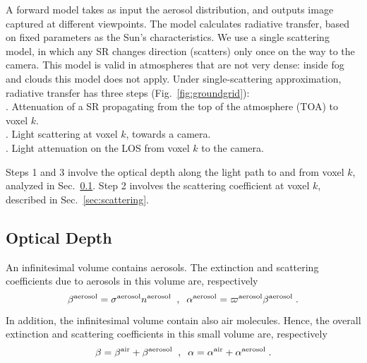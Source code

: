 \documentclass[10pt,twocolumn,letterpaper]{article}
\newcommand{\yoavcomment}[1]{}
\renewcommand{\yoavcomment}[1]{#1} %
\begin{document}
A forward model takes as input the aerosol distribution, and outputs image captured at different viewpoints. The model calculates radiative transfer, based on fixed parameters as the Sun's characteristics. We use a single scattering model, in which any SR changes direction (scatters) only once on the way to the camera. This model is valid in atmospheres that are not very dense: inside fog and clouds this model does not apply. Under single-scattering approximation, radiative transfer has three steps (Fig.~\ref{fig:groundgrid}):\\

\vspace{-0.35cm}
. Attenuation of a SR propagating from the top of the atmosphere
  (TOA) to voxel $k$. \\

\vspace{-0.35cm}
. Light scattering at voxel $k$, towards a camera.\\

\vspace{-0.35cm}
. Light attenuation on the LOS from voxel $k$ to the camera.

\noindent
Steps 1 and 3 involve the optical depth
along the light path to and from voxel $k$, analyzed in Sec.~\ref{sec:optical-depth}.
Step 2 involves the scattering coefficient at voxel $k$,
described in Sec.~\ref{sec:scattering}.
%

\subsection{Optical Depth}
\label{sec:optical-depth}

An infinitesimal volume contains aerosols. The extinction and scattering coefficients due to aerosols in this volume are, respectively
\begin{equation}
  \beta^{\rm aerosol}=\sigma^{\rm aerosol} n^{\rm aerosol}
  \;\;,\;\;
  \alpha^{\rm aerosol}=\varpi^{\rm aerosol} \beta^{\rm aerosol}
  \;.
  \label{eq:betaer}
\end{equation}
In addition, the infinitesimal volume contain also air molecules. Hence, the overall
extinction and scattering coefficients in this small volume are, respectively
\begin{equation}
  \beta=\beta^{\rm air}+\beta^{\rm aerosol}
  \;\;,\;\;
  \alpha=\alpha^{\rm air}+\alpha^{\rm aerosol}
  \;.
  \label{eq:betair}
\end{equation}
\end{document}
